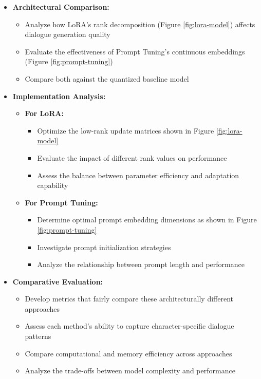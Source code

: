 \documentclass{article}
\begin{document}
\begin{itemize}
\item \textbf{Architectural Comparison:}
    \begin{itemize}
        \item Analyze how LoRA's rank decomposition (Figure \ref{fig:lora-model}) affects dialogue generation quality
        \item Evaluate the effectiveness of Prompt Tuning's continuous embeddings (Figure \ref{fig:prompt-tuning})
        \item Compare both against the quantized baseline model
    \end{itemize}
    
\item \textbf{Implementation Analysis:}
    \begin{itemize}
        \item \textbf{For LoRA:}
        \begin{itemize}
            \item Optimize the low-rank update matrices shown in Figure \ref{fig:lora-model}
            \item Evaluate the impact of different rank values on performance
            \item Assess the balance between parameter efficiency and adaptation capability
        \end{itemize}
        \item \textbf{For Prompt Tuning:}
        \begin{itemize}
            \item Determine optimal prompt embedding dimensions as shown in Figure \ref{fig:prompt-tuning}
            \item Investigate prompt initialization strategies
            \item Analyze the relationship between prompt length and performance
        \end{itemize}
    \end{itemize}

\item \textbf{Comparative Evaluation:}
    \begin{itemize}
        \item Develop metrics that fairly compare these architecturally different approaches
        \item Assess each method's ability to capture character-specific dialogue patterns
        \item Compare computational and memory efficiency across approaches
        \item Analyze the trade-offs between model complexity and performance
    \end{itemize}
\end{itemize}
\end{document}
